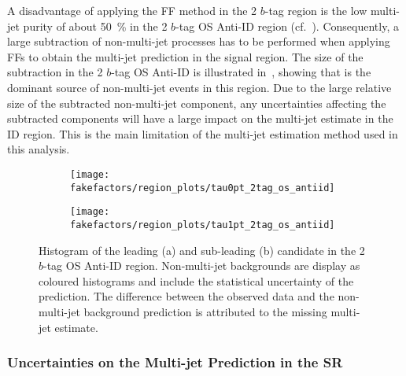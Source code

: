 A disadvantage of applying the FF method in the 2 $b$-tag region is the low
multi-jet purity of about \SI{50}{\percent} in the 2 $b$-tag OS Anti-ID region
(cf.\ ). Consequently, a large subtraction of
non-multi-jet processes has to be performed when applying FFs to obtain the
multi-jet prediction in the signal region.  The size of the subtraction in the 2
$b$-tag OS Anti-ID is illustrated in~, showing
that \ttbarFakes is the dominant source of non-multi-jet events in this
region. Due to the large relative size of the subtracted non-multi-jet
component, any uncertainties affecting the subtracted components will have a
large impact on the multi-jet estimate in the ID region. This is the main
limitation of the multi-jet estimation method used in this analysis.

\begin{figure}[htbp]
  \centering

  \begin{subfigure}{0.49\textwidth}
    \texttt{[image: fakefactors/region\_plots/tau0pt\_2tag\_os\_antiid]}
    \subcaption{}
  \end{subfigure}
  \begin{subfigure}{0.49\textwidth}
    \texttt{[image: fakefactors/region\_plots/tau1pt\_2tag\_os\_antiid]}
    \subcaption{}
  \end{subfigure}

  \caption{Histogram of the leading (a) and sub-leading (b) \tauhadvis
    candidate \pT in the 2 $b$-tag OS Anti-ID region. Non-multi-jet
    backgrounds are display as coloured histograms and include the
    statistical uncertainty of the prediction. The difference between
    the observed data and the non-multi-jet background prediction is
    attributed to the missing multi-jet estimate.}%
  \label{fig:mjfakes_2tag_os_antiid}
\end{figure}


\subsubsection{Uncertainties on the Multi-jet Prediction in the \hadhad SR}

%

